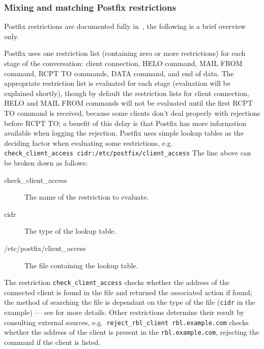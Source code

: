 \subsubsection{Mixing and matching Postfix restrictions}

Postfix restrictions are documented fully in~\cite{smtpd_access_readme,
smtpd_per_user_control, policy-servers}, the following is a brief overview
only.

Postfix uses one restriction list (containing zero or more restrictions)
for each stage of the \SMTP{} conversation: client connection, HELO
command, MAIL FROM command, RCPT TO commands, DATA command, and end of
data.  The appropriate restriction list is evaluated for each stage
(evaluation will be explained shortly), though by default the restriction
lists for client connection, HELO and MAIL FROM commands will not be
evaluated until the first RCPT TO command is received, because some clients
don't deal properly with rejections before RCPT TO\@; a benefit of this
delay is that Postfix has more information available when logging the
rejection.  Postfix uses simple lookup tables as the deciding factor when
evaluating some restrictions, e.g.\newline
\tab{}\texttt{check\_client\_access~cidr:/etc/postfix/client\_access}
\newline The line above can be broken down as follows:

\begin{description}

    \item [check\_client\_access] The name of the restriction to evaluate.

    \item [cidr] The type of the lookup table.

    \item [/etc/postfix/client\_access] The file containing the lookup
        table.

\end{description}

The restriction \texttt{check\_client\_access} checks whether the \IP{}
address of the connected client is found in the file and returned the
associated action if found; the method of searching the file is dependant
on the type of the file (\texttt{cidr} in the example) --- see
\cite{postfix-lookup-tables} for more details.  Other restrictions
determine their result by consulting external sources, e.g.\
\texttt{reject\_rbl\_client rbl.example.com} checks whether the \IP{}
address of the client is present in the \RBL{} \texttt{rbl.example.com},
rejecting the command if the client is listed.

